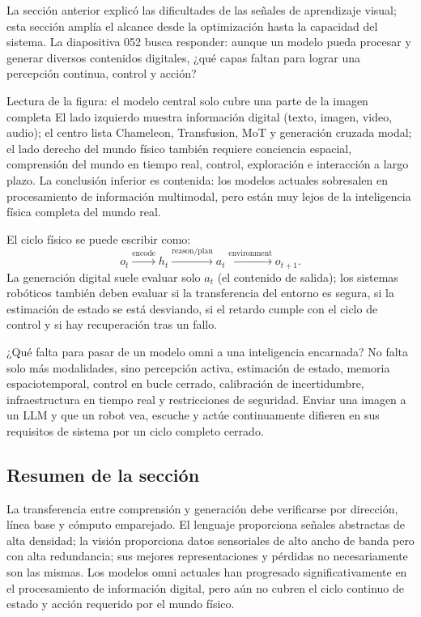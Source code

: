 La sección anterior explicó las dificultades de las señales de aprendizaje visual; esta sección amplía el alcance desde la optimización hasta la capacidad del sistema. La diapositiva 052 busca responder: aunque un modelo pueda procesar y generar diversos contenidos digitales, ¿qué capas faltan para lograr una percepción continua, control y acción?


\begin{knowledgebox}{Lectura de la figura: el modelo central solo cubre una parte de la imagen completa}
El lado izquierdo muestra información digital (texto, imagen, video, audio); el centro lista Chameleon, Transfusion, MoT y generación cruzada modal; el lado derecho del mundo físico también requiere conciencia espacial, comprensión del mundo en tiempo real, control, exploración e interacción a largo plazo. La conclusión inferior es contenida: los modelos actuales sobresalen en procesamiento de información multimodal, pero están muy lejos de la inteligencia física completa del mundo real.
\end{knowledgebox}

El ciclo físico se puede escribir como:
$$
o_t\xrightarrow{\text{encode}}h_t
\xrightarrow{\text{reason/plan}}a_t
\xrightarrow{\text{environment}}o_{t+1}.
$$
La generación digital suele evaluar solo $a_t$ (el contenido de salida); los sistemas robóticos también deben evaluar si la transferencia del entorno es segura, si la estimación de estado se está desviando, si el retardo cumple con el ciclo de control y si hay recuperación tras un fallo.

\begin{importantbox}{¿Qué falta para pasar de un modelo omni a una inteligencia encarnada?}
No falta solo más modalidades, sino percepción activa, estimación de estado, memoria espaciotemporal, control en bucle cerrado, calibración de incertidumbre, infraestructura en tiempo real y restricciones de seguridad. Enviar una imagen a un LLM y que un robot vea, escuche y actúe continuamente difieren en sus requisitos de sistema por un ciclo completo cerrado.
\end{importantbox}

\subsection{Resumen de la sección}

La transferencia entre comprensión y generación debe verificarse por dirección, línea base y cómputo emparejado. El lenguaje proporciona señales abstractas de alta densidad; la visión proporciona datos sensoriales de alto ancho de banda pero con alta redundancia; sus mejores representaciones y pérdidas no necesariamente son las mismas. Los modelos omni actuales han progresado significativamente en el procesamiento de información digital, pero aún no cubren el ciclo continuo de estado y acción requerido por el mundo físico.


